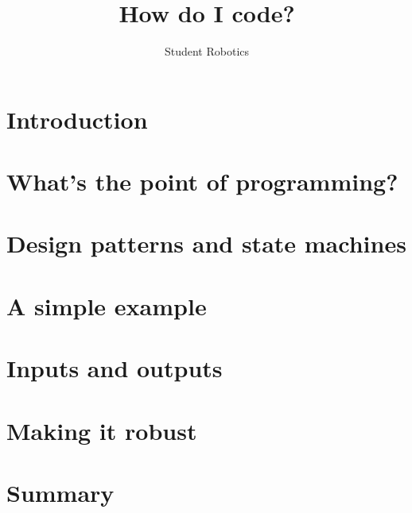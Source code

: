 \documentclass[a4paper,10pt]{article}
\title{How do I code?}
\author{Student Robotics}
\begin{document}
\section{Introduction}
\section{What's the point of programming?}
\section{Design patterns and state machines}
\section{A simple example}
\section{Inputs and outputs}
\section{Making it robust}
\section{Summary}
\end{document}
